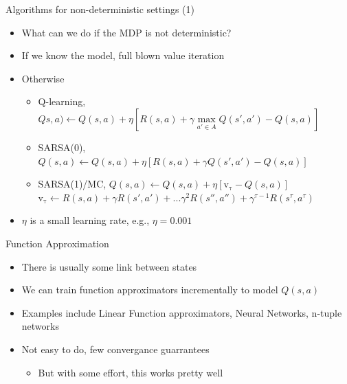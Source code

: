 \documentclass[]{beamer}
\providecommand{\tightlist}{%
  \setlength{\itemsep}{0pt}\setlength{\parskip}{0pt}}
\begin{document}
\begin{frame}{Algorithms for non-deterministic settings (1)}

\begin{itemize}
\tightlist
\item
  What can we do if the MDP is not deterministic?
\item
  If we know the model, full blown value iteration
\item
  Otherwise

  \begin{itemize}
  \tightlist
  \item
    Q-learning,
    \(Qs,a) \gets Q(s,a) + \eta\left[R(s,a) + \gamma \max\limits_{a' \in A}Q(s',a') - Q(s,a) \right]\)
  \item
    SARSA(0),
    \(Q(s,a) \gets Q(s,a) + \eta\left[R(s,a) + \gamma Q(s',a') - Q(s,a) \right]\)
  \item
    SARSA(1)/MC,
    \(Q(s,a) \gets Q(s,a) + \eta\left[\mathrm{v_\tau} - Q(s,a)\right]\)
    \(\mathrm{v_\tau} \gets R(s,a)+\gamma R(s',a')+...\gamma^2 R(s'',a'') + \gamma^{\tau-1}R(s^\tau, a^\tau)\)
  \end{itemize}
\item
  \(\eta\) is a small learning rate, e.g., \(\eta = 0.001\)
\end{itemize}

\end{frame}

\begin{frame}{Function Approximation}

\begin{itemize}
\tightlist
\item
  There is usually some link between states
\item
  We can train function approximators incrementally to model \(Q(s,a)\)
\item
  Examples include Linear Function approximators, Neural Networks,
  n-tuple networks
\item
  Not easy to do, few convergance guarrantees

  \begin{itemize}
  \tightlist
  \item
    But with some effort, this works pretty well
  \end{itemize}
\end{itemize}

\end{frame}
\end{document}
